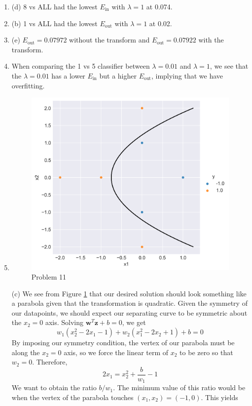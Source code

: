 \documentclass[12pt]{article}
\newcommand{\Ein}{E_{\text{in}}}
\newcommand{\Eout}{E_{\text{out}}}
\begin{document}
\begin{enumerate}[leftmargin=*]
\item (d) 8 vs ALL had the lowest $\Ein$ with $\lambda = 1$ at 0.074.
\item (b) 1 vs ALL had the lowest $\Eout$ with $\lambda = 1$ at 0.02.
\item (e) $\Eout = 0.07972$ without the transform and $\Eout = 0.07922$ with the transform.
\item When comparing the 1 vs 5 classifier between $\lambda = 0.01$ and $\lambda = 1$, we see that the $\lambda = 0.01$ has a lower $\Ein$ but a higher $\Eout$, implying that we have overfitting.
\item 
\begin{figure}[t]
\centering
\includegraphics[scale=0.9]{support_vec_plot.png}
\caption{Problem 11} \label{Problem 11}
\end{figure} (c) We see from Figure \ref{Problem 11} that our desired solution should look something like a parabola given that the transformation is quadratic. Given the symmetry of our datapoints, we should expect our separating curve to be symmetric about the $x_2 = 0$ axis. Solving $\mathbf w^T \mathbf z + b = 0$, we get
\[ w_1 (x_2^2 - 2 x_1 - 1) + w_2 (x_1^2 - 2 x_2 + 1) + b = 0 \]
By imposing our symmetry condition, the vertex of our parabola must be along the $x_2 = 0$  axis, so we force the linear term of $x_2$ to be zero so that $w_2 = 0$. Therefore,
\[ 2 x_1 = x_2^2 + \frac{b}{w_1} - 1 \]
We want to obtain the ratio $b / w_1$. The minimum value of this ratio would be when the vertex of the parabola touches $(x_1, x_2) = (-1, 0)$. This yields

\end{enumerate}
\end{document}
